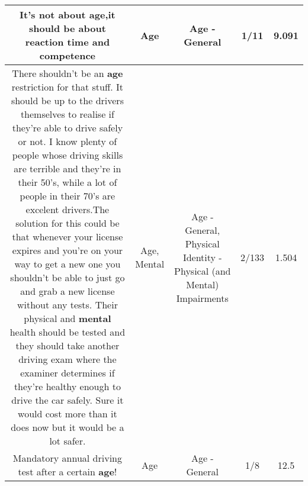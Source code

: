 \documentclass[11pt]{article}
\newlength\mylength
\begin{document}
\begin{center}
\begin{longtable}{|C{.65\mylength}|C{.30\mylength}|C{.12\mylength}|C{.12\mylength}|C{.12\mylength}|}
  \small It's not about \textbf{age},it should be about reaction time and competence\normalsize   & Age & Age - General & 1/11 & 9.091 \\  \hline
  \small There shouldn't be an \textbf{age} restriction for that stuff. It should be up to the drivers themselves to realise if they're able to drive safely or not. I know plenty of people whose driving skills are terrible and they're in their 50's, while a lot of people in their 70's are excelent drivers.The solution for this could be that whenever your license expires and you're on your way to get a new one you shouldn't be able to just go and grab a new license without any tests. Their physical and \textbf{mental} health should be tested and they should take another driving exam where the examiner determines if they're healthy enough to drive the car safely. Sure it would cost more than it does now but it would be a lot safer.\normalsize   & Age, Mental & Age - General, Physical Identity - Physical (and Mental) Impairments & 2/133 & 1.504 \\  \hline
  \small Mandatory annual driving test after a certain \textbf{age}!\normalsize   & Age & Age - General & 1/8 & 12.5 \\  \hline

\end{longtable}
\end{center}
\end{document}
